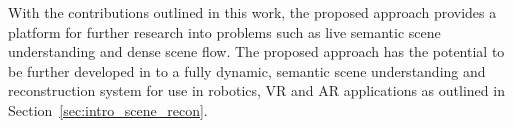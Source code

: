 With the contributions outlined in this work, the proposed approach provides a platform 
for further research into problems such as live semantic scene understanding and dense scene 
flow. The proposed approach has the potential to be further developed in to a fully dynamic, 
semantic scene understanding and reconstruction system for use in robotics, VR and AR applications 
as outlined in Section~\ref{sec:intro_scene_recon}.